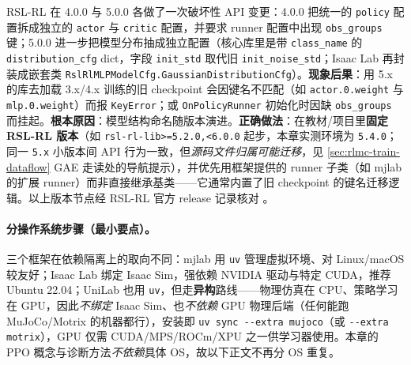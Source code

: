\begin{pitfall}
RSL-RL 在 4.0.0 与 5.0.0 各做了一次破坏性 API 变更：4.0.0 把统一的 \verb|policy| 配置拆成独立的 \verb|actor| 与 \verb|critic| 配置，并要求 runner 配置中出现 \verb|obs_groups| 键；5.0.0 进一步把模型分布抽成独立配置（核心库里是带 \verb|class_name| 的 \verb|distribution_cfg| dict，字段 \verb|init_std| 取代旧 \verb|init_noise_std|；Isaac Lab 再封装成嵌套类 \verb|RslRlMLPModelCfg.GaussianDistributionCfg|）。\textbf{现象后果}：用 5.x 的库去加载 3.x/4.x 训练的旧 checkpoint 会因键名不匹配（如 \verb|actor.0.weight| 与 \verb|mlp.0.weight|）而报 \verb|KeyError|；或 \verb|OnPolicyRunner| 初始化时因缺 \verb|obs_groups| 而挂起。\textbf{根本原因}：模型结构命名随版本演进。\textbf{正确做法}：在教材/项目里\textbf{固定 RSL-RL 版本}（如 \verb|rsl-rl-lib>=5.2.0,<6.0.0| 起步，本章实测环境为 \verb|5.4.0|；同一 \verb|5.x| 小版本间 API 行为一致，但\emph{源码文件归属可能迁移}，见 \cref{sec:rlmc-train-dataflow} GAE 走读处的导航提示），并优先用框架提供的 runner 子类（如 mjlab 的扩展 runner）而非直接继承基类——它通常内置了旧 checkpoint 的键名迁移逻辑。以上版本节点经 RSL-RL 官方 release 记录核对 \cite{schwarke2025rslrl}。
\end{pitfall}

\paragraph{分操作系统步骤（最小要点）。}三个框架在依赖隔离上的取向不同：mjlab 用 \verb|uv| 管理虚拟环境、对 Linux/macOS 较友好；Isaac Lab 绑定 Isaac Sim，强依赖 NVIDIA 驱动与特定 CUDA，推荐 Ubuntu 22.04；UniLab 也用 \verb|uv|，但走\textbf{异构}路线——物理仿真在 CPU、策略学习在 GPU，因此\emph{不绑定} Isaac Sim、也\emph{不依赖} GPU 物理后端（任何能跑 MuJoCo/Motrix 的机器都行），安装即 \verb|uv sync --extra mujoco|（或 \verb|--extra motrix|），GPU 仅需 CUDA/MPS/ROCm/XPU 之一供学习器使用。本章的 PPO 概念与诊断方法\emph{不依赖}具体 OS，故以下正文不再分 OS 重复。

